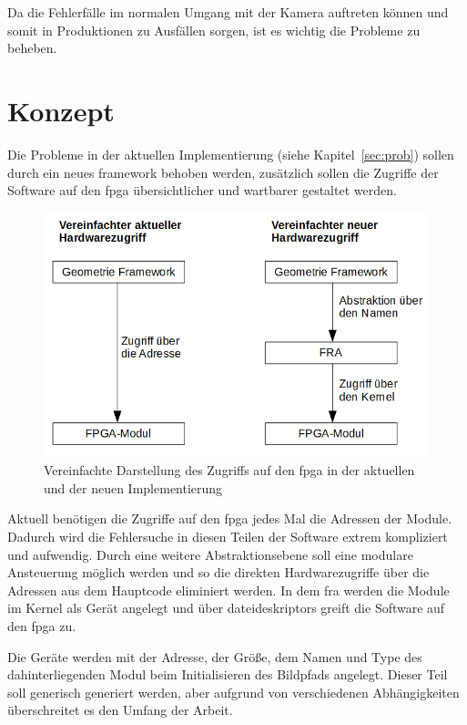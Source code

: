 Da die Fehlerfälle im normalen Umgang mit der Kamera auftreten können und somit in Produktionen zu Ausfällen sorgen, ist es wichtig die Probleme zu beheben.

\section{Konzept}\label{sec:konzept}
Die Probleme in der aktuellen Implementierung (siehe Kapitel~\ref{sec:prob}) sollen durch ein neues \gls{framework} behoben werden, zusätzlich sollen die Zugriffe der Software auf den \ac{fpga} übersichtlicher und wartbarer gestaltet werden.

\begin{figure}[!hbtp]
	\centering
	\includegraphics[width = 0.9\linewidth]{pictures/2019-11-17_ImplementierungNewvsOld.png}
	\smallskip
	\caption{Vereinfachte Darstellung des Zugriffs auf den \ac{fpga} in der aktuellen und der neuen Implementierung}
	\label{fig:newvsold}
\end{figure} 



Aktuell benötigen die Zugriffe auf den \ac{fpga} jedes Mal die Adressen der Module. Dadurch wird die Fehlersuche in diesen Teilen der Software extrem kompliziert und aufwendig. Durch eine weitere Abstraktionsebene soll eine modulare Ansteuerung möglich werden und so die direkten Hardwarezugriffe über die Adressen aus dem Hauptcode eliminiert werden. In dem \ac{fra} werden die Module im Kernel als Gerät angelegt und über \glspl{dateideskriptor} greift die Software auf den \ac{fpga} zu.


Die Geräte werden mit der Adresse, der Größe, dem Namen und Type des dahinterliegenden Modul beim Initialisieren des Bildpfads angelegt. Dieser Teil soll generisch generiert werden, aber aufgrund von verschiedenen Abhängigkeiten überschreitet es den Umfang der Arbeit.


